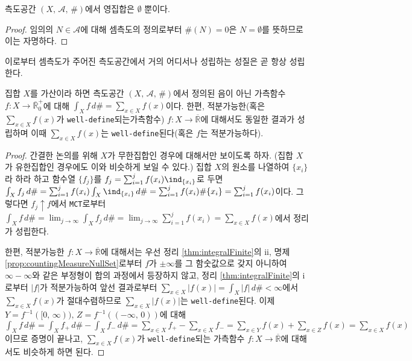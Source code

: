 \begin{proposition}\label{prop:countingMeasureNullSet}
    측도공간 $(X,\,\mathcal{A},\,\#)$에서 영집합은 $\emptyset$ 뿐이다.
\end{proposition}

\begin{proof}
    임의의 $N\in\mathcal{A}$에 대해 셈측도의 정의로부터 $\#(N)=0$은 $N=\emptyset$를 뜻하므로 이는 자명하다.
\end{proof}

이로부터 셈측도가 주어진 측도공간에서 거의 어디서나 성립하는 성질은 곧 항상 성립한다.

\begin{theorem}\label{thm:countingMeasrueInt}
    집합 $X$를 가산이라 하면 측도공간 $(X,\,\mathcal{A},\,\#)$에서 정의된 음이 아닌 가측함수 $f:X\to\overline{\mathbb{R}}^+_0$에 대해 $\int_Xf\,d\#=\sum_{x\in X}f(x)$이다. 한편, 적분가능한(혹은 $\sum_{x\in X}f(x)$가 \texttt{well-define}되는\footnotemark 가측함수) $f:X\to\overline{\mathbb{R}}$에 대해서도 동일한 결과가 성립하며 이때 $\sum_{x\in X}f(x)$는 \texttt{well-define}된다(혹은 $f$는 적분가능하다).
\end{theorem}

\begin{proof}
    간결한 논의를 위해 $X$가 무한집합인 경우에 대해서만 보이도록 하자. (집합 $X$가 유한집합인 경우에도 이와 비슷하게 보일 수 있다.) 집합 $X$의 원소를 나열하여 $\{x_i\}$라 하라 하고 함수열 $\{f_j\}$를 $f_j=\sum_{i=1}^jf(x_i)\ind_{\{x_i\}}$로 두면 $\int_Xf_j\,d\#=\sum_{i=1}^jf(x_i)\int_X\ind_{\{x_i\}}\,d\#=\sum_{i=1}^jf(x_i)\#\{x_i\}=\sum_{i=1}^jf(x_i)$이다. 그렇다면 $f_j\uparrow f$에서 \texttt{MCT}로부터 $\int_Xf\,d\#=\lim_{j\to\infty}\int_Xf_j\,d\#=\lim_{j\to\infty}\sum_{i=1}^jf(x_i)=\sum_{x\in X}f(x)$에서 정리가 성립한다.
    
    한편, 적분가능한 $f:X\to\overline{\mathbb{R}}$에 대해서는 우선 정리 \ref{thm:integralFinite}의 ii, 명제 \ref{prop:countingMeasureNullSet}로부터 $f$가 $\pm\infty$를 그 함숫값으로 갖지 아니하여 $\infty-\infty$와 같은 부정형이 합의 과정에서 등장하지 않고, 정리 \ref{thm:integralFinite}의 i로부터 $|f|$가 적분가능하여 앞선 결과로부터 $\sum_{x\in X}|f(x)|=\int_X|f|\,d\#<\infty$에서 $\sum_{x\in X}f(x)$가 절대수렴하므로 $\sum_{x\in X}|f(x)|$는 \texttt{well-define}된다. 이제 $Y=f^{-1}([0,\,\infty)),\,Z=f^{-1}((-\infty,\,0))$에 대해
    $\int_Xf\,d\#=\int_Xf_+\,d\#-\int_Xf_-\,d\#=\sum_{x\in X}f_+-\sum_{x\in X}f_-=\sum_{x\in Y}f(x)+\sum_{x\in Z}f(x)=\sum_{x\in X}f(x)$이므로 증명이 끝나고, $\sum_{x\in X}f(x)$가 \texttt{well-define}되는 가측함수 $f:X\to\overline{\mathbb{R}}$에 대해서도 비슷하게 하면 된다.
\end{proof}

